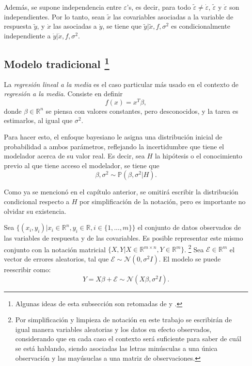 Adem\'as, se supone independencia entre $\varepsilon$'s, es decir, para todo $\tilde{\varepsilon} \neq \dot{\varepsilon}$, $\tilde{\varepsilon}$ y $\dot{\varepsilon}$ son independientes. Por lo tanto, sean $\tilde{x}$ las covariables asociadas a la variable de respuesta $\tilde{y}$, y $\dot{x}$ las asociadas a $\dot{y}$, se tiene que $\tilde{y} | \tilde{x}, f, \sigma^2$ es condicionalmente independiente a $\dot{y} | \dot{x}, f, \sigma^2$.

\subsection[Modelo tradicional]{
    Modelo tradicional
    \footnote{Algunas ideas de esta subsecci\'on son retomadas de \cite{Denison_BayesMethods} y \cite{Bannerjee_BayLinMod}.}
}

La \textit{regresi\'on lineal a la media} es el caso particular m\'as usado en el contexto de \textit{regresi\'on a la media}. Consiste en definir
\begin{equation*}
    f(x) = x^T\beta,
\end{equation*}
donde $\beta \in \mathbb{R}^n$ se piensa con valores constantes, pero desconocidos, y la tarea es estimarlos, al igual que $\sigma^2$.

Para hacer esto, el enfoque bayesiano le asigna una distribución inicial de probabilidad a ambos par\'ametros, reflejando la incertidumbre que tiene el modelador acerca de su valor real. Es decir, sea $H$ la hip\'otesis o el conocimiento previo al que tiene acceso el modelador, se tiene que 
\begin{equation*}
    \beta,\sigma^2 \sim \mathbb{P}(\beta,\sigma^2|H).
\end{equation*}

Como ya se mencion\'o en el cap\'itulo anterior, se omitir\'a escribir la distribuci\'on condicional respecto a $H$ por simplificaci\'on de la notaci\'on, pero es importante no olvidar su existencia.

Sea $\{(x_i,y_i)| x_i \in \mathbb{R}^n, y_i \in \mathbb{R}, i \in \{1,...,m\} \}$ el conjunto de datos observados de las variables de respuesta y de las covariables. Es posible representar este mismo conjunto con la notaci\'on matricial $\{X,Y | X \in \mathbb{R}^{m \times n}, Y \in \mathbb{R}^m\}$. \footnote{Por simplificaci\'on y limpieza de notaci\'on en este trabajo se escribir\'an de igual manera variables aleatorias y los datos en efecto observados, considerando que en cada caso el contexto ser\'a suficiente para saber de cu\'al se est\'a hablando, siendo asociadas las letras min\'usculas a una \'unica observaci\'on y las may\'usuclas a una matriz de observaciones.} Sea $\mathcal{E} \in \mathbb{R}^m$ el vector de errores aleatorios, tal que $\mathcal{E} \sim \mathcal{N}(0,\sigma^2 I)$. El modelo se puede reescribir como:
\begin{equation*}
    Y = X\beta + \mathcal{E} \sim \mathcal{N}(X\beta,\sigma^2 I).
\end{equation*}

